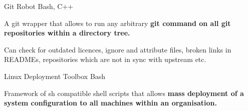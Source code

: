 \begin{projentries}
\projentry%
  {Git Robot} %
  {Bash, C++} %
  {} %
  {%
    \begin{projitems} %
      \item{A git wrapper that allows to run any arbitrary \textbf{git command
            on all git repositories within a directory tree.}}
      \item{Can check for outdated licences, ignore and attribute files,
            broken links in READMEs, repositories which are not in sync
            with upstream etc.}
    \end{projitems}
  }

\projentry%
  {Linux Deployment Toolbox} %
  {Bash} %
  {} %
  {%
    \begin{projitems} %
    \item{Framework of sh compatible shell scripts that allows \textbf{mass
          deployment of a system configuration to all machines within an
          organisation.}}
    \end{projitems}
  }

\end{projentries}
